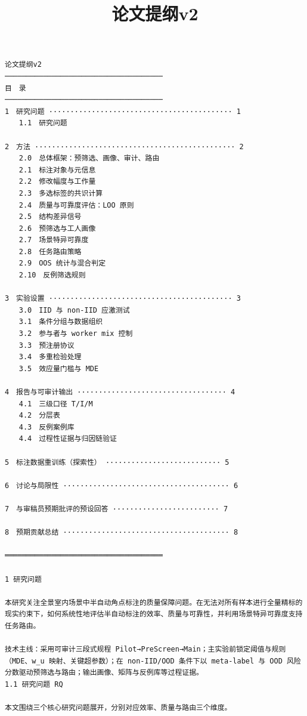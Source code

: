 \documentclass[a4paper,12pt]{article}
\title{论文提纲v2}
\author{}
\date{}
\begin{document}
\maketitle

\vspace{0.5em}

\begin{Verbatim}[fontsize=\small,breaklines=true,breakanywhere=true]
论文提纲v2
─────────────────────────────────────
目　录
─────────────────────────────────────
1　研究问题 ··········································· 1
　　1.1　研究问题

2　方法 ··············································· 2
　　2.0　总体框架：预筛选、画像、审计、路由
　　2.1　标注对象与元信息
　　2.2　修改幅度与工作量
　　2.3　多选标签的共识计算
　　2.4　质量与可靠度评估：LOO 原则
　　2.5　结构差异信号
　　2.6　预筛选与工人画像
　　2.7　场景特异可靠度
　　2.8　任务路由策略
　　2.9　OOS 统计与混合判定
　　2.10　反例筛选规则

3　实验设置 ··········································· 3
　　3.0　IID 与 non-IID 应激测试
　　3.1　条件分组与数据组织
　　3.2　参与者与 worker mix 控制
　　3.3　预注册协议
　　3.4　多重检验处理
　　3.5　效应量门槛与 MDE

4　报告与可审计输出 ··································· 4
　　4.1　三级口径 T/I/M
　　4.2　分层表
　　4.3　反例案例库
　　4.4　过程性证据与归因链验证

5　标注数据重训练（探索性） ··························· 5

6　讨论与局限性 ······································· 6

7　与审稿员预期批评的预设回答 ························· 7

8　预期贡献总结 ······································· 8

═════════════════════════════════════

1 研究问题

本研究关注全景室内场景中半自动角点标注的质量保障问题。在无法对所有样本进行全量精标的现实约束下，如何系统性地评估半自动标注的效率、质量与可靠性，并利用场景特异可靠度支持任务路由。

技术主线：采用可审计三段式规程 Pilot→PreScreen→Main；主实验前锁定阈值与规则（MDE、w_u 映射、关键超参数）；在 non-IID/OOD 条件下以 meta-label 与 OOD 风险分数驱动预筛选与路由；输出画像、矩阵与反例库等过程证据。
1.1 研究问题 RQ

本文围绕三个核心研究问题展开，分别对应效率、质量与路由三个维度。


\end{Verbatim}
\end{document}
